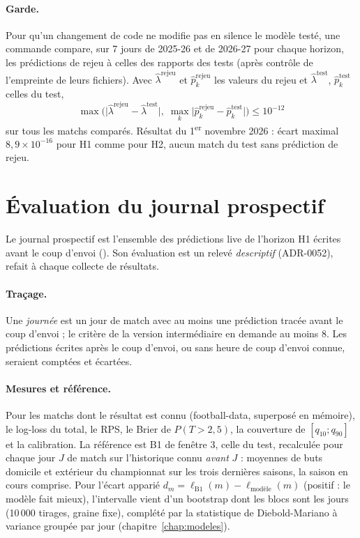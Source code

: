 \paragraph{Garde.} Pour qu'un changement de code ne modifie pas en silence le modèle testé, une commande
compare, sur 7 jours de 2025-26 et de 2026-27 pour chaque horizon, les prédictions de rejeu à celles des
rapports des tests (après contrôle de l'empreinte  de leurs fichiers). Avec \(\hat\lambda^{\mathrm{rejeu}}\)
et \(\hat p^{\mathrm{rejeu}}_k\) les valeurs du rejeu et \(\hat\lambda^{\mathrm{test}}\), \(\hat p^{\mathrm{test}}_k\) celles du test,
\[
  \max\Big(\big|\hat\lambda^{\mathrm{rejeu}} - \hat\lambda^{\mathrm{test}}\big|,\;
  \max_{k}\big|\hat p^{\mathrm{rejeu}}_k - \hat p^{\mathrm{test}}_k\big|\Big) \le 10^{-12}
\]
sur tous les matchs comparés. Résultat du 1\textsuperscript{er} novembre 2026 : écart maximal
\(8{,}9 \times 10^{-16}\) pour H1 comme pour H2, aucun match du test sans prédiction de rejeu.

\section{Évaluation du journal prospectif}
\label{sec:inference-prospectif}

Le journal prospectif est l'ensemble des prédictions live de l'horizon H1 écrites avant le coup d'envoi
(). Son évaluation est un relevé \emph{descriptif} (ADR-0052), refait à chaque
collecte de résultats.

\paragraph{Traçage.} Une \emph{journée} est un jour de match avec au moins une prédiction tracée avant le
coup d'envoi ; le critère de la version intermédiaire en demande au moins 8. Les prédictions écrites après
le coup d'envoi, ou sans heure de coup d'envoi connue, seraient comptées et écartées.

\paragraph{Mesures et référence.} Pour les matchs dont le résultat est connu (football-data, superposé en
mémoire), le log-loss du total, le RPS, le Brier de \(P(T > 2{,}5)\), la couverture de \([q_{10} ; q_{90}]\)
et la calibration. La référence est B1 de fenêtre 3, celle du test, recalculée pour chaque jour \(J\) de
match sur l'historique connu \emph{avant} \(J\) : moyennes de buts domicile et extérieur du championnat sur
les trois dernières saisons, la saison en cours comprise. Pour l'écart apparié
\(d_m = \ell_{\mathrm{B1}}(m) - \ell_{\mathrm{modèle}}(m)\) (positif : le modèle fait mieux), l'intervalle
vient d'un bootstrap dont les blocs sont les jours (10\,000 tirages, graine fixe), complété par la statistique
de Diebold-Mariano à variance groupée par jour (chapitre~\ref{chap:modeles}).

